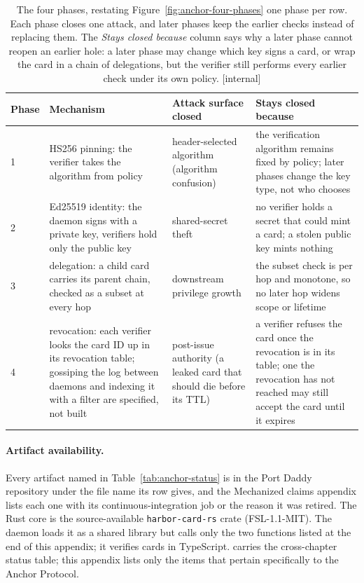 \documentclass[11pt,a4paper]{article}
\theoremstyle{definition}
\begin{document}
\begin{table}[H]
\centering
\caption{The four phases, restating Figure~\ref{fig:anchor-four-phases} one phase per row. Each phase closes one attack, and later phases keep the earlier checks instead of replacing them. The \emph{Stays closed because} column says why a later phase cannot reopen an earlier hole: a later phase may change which key signs a card, or wrap the card in a chain of delegations, but the verifier still performs every earlier check under its own policy.
[internal]}
\label{tab:anchor-four-phases}
\small
\renewcommand{\arraystretch}{1.15}
\begin{tabularx}{\linewidth}{@{}l>{\raggedright\arraybackslash}X>{\raggedright\arraybackslash}X>{\raggedright\arraybackslash}X@{}}
\toprule
\textbf{Phase} & \textbf{Mechanism} & \textbf{Attack surface closed} & \textbf{Stays closed because} \\
\midrule
1 & HS256 pinning: the verifier takes the algorithm from policy & header-selected algorithm (algorithm confusion) & the verification algorithm remains fixed by policy; later phases change the key type, not who chooses \\
2 & Ed25519 identity: the daemon signs with a private key, verifiers hold only the public key & shared-secret theft & no verifier holds a secret that could mint a card; a stolen public key mints nothing \\
3 & delegation: a child card carries its parent chain, checked as a subset at every hop & downstream privilege growth & the subset check is per hop and monotone, so no later hop widens scope or lifetime \\
4 & revocation: each verifier looks the card ID up in its revocation table; gossiping the log between daemons and indexing it with a filter are specified, not built & post-issue authority (a leaked card that should die before its TTL) & a verifier refuses the card once the revocation is in its table; one the revocation has not reached may still accept the card until it expires \\
\bottomrule
\end{tabularx}
\end{table}

\paragraph{Artifact availability.} Every artifact named in Table~\ref{tab:anchor-status} is in the Port Daddy repository under the file name its row gives, and the Mechanized claims appendix lists each one with its continuous-integration job or the reason it was retired. The Rust core is the source-available \texttt{harbor-card-rs} crate (FSL-1.1-MIT). The daemon loads it as a shared library but calls only the two functions listed at the end of this appendix; it verifies cards in TypeScript.  carries the cross-chapter status table; this appendix lists only the items that pertain specifically to the Anchor Protocol.
\end{document}
